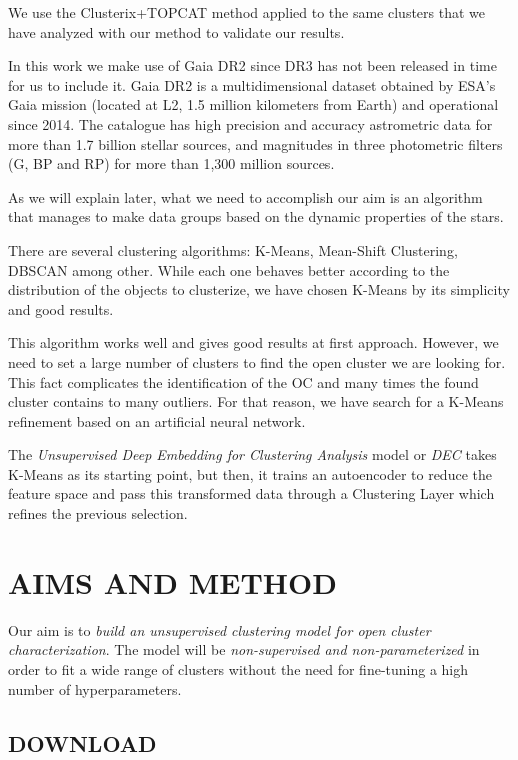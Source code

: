\documentclass[11pt,a4paper,english,twocolumn]{article}
\begin{document}
We use the Clusterix+TOPCAT method applied to the same clusters that we have analyzed
with our method to validate our results.

In this work we make use of Gaia DR2 since DR3 has not been released in time for us to include it.
Gaia DR2 is a multidimensional dataset obtained by ESA's Gaia mission
(located at L2, 1.5 million kilometers from Earth) and operational since 2014.
The catalogue has high precision and accuracy astrometric data for more than 1.7 billion stellar sources,
and magnitudes in three photometric filters (G, BP and RP) for more than 1,300 million sources.

As we will explain later, what we need to accomplish our aim is an algorithm
that manages to make data groups based on the dynamic properties of the stars.

There are several clustering algorithms: K-Means, Mean-Shift Clustering, DBSCAN \cite{ester1996density}
among other. While each one behaves better according to the distribution of the objects
to clusterize, we have chosen K-Means by its simplicity and good results.

This algorithm works well and gives good results at first approach.
However, we need to set a large number of clusters to find the open cluster we are looking for.
This fact complicates the identification of the OC and many times the found cluster contains to many outliers.
For that reason, we have search for a K-Means refinement based on an artificial neural network.

The \emph{Unsupervised Deep Embedding for Clustering Analysis} model
or \emph{DEC} \cite{xie2016unsupervised} takes K-Means as its starting point,
but then, it trains an autoencoder to reduce the feature space
and pass this transformed data through a Clustering Layer which refines the previous selection.

\section{AIMS AND METHOD}

Our aim is to \emph{build an unsupervised clustering model for open cluster characterization}.
The model will be \emph{non-supervised and non-parameterized} in order to fit a wide range
of clusters without the need for fine-tuning a high number of hyperparameters.

\subsection{DOWNLOAD}
\end{document}
